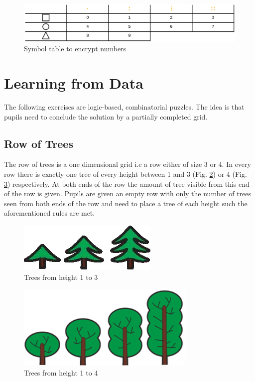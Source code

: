 \begin{figure} 
    \centering
    \includegraphics[width=1.0 \columnwidth]{figures/symbol_table.png}
    \caption{Symbol table to encrypt numbers} 
    \label{fig:symbol_table} 
\end{figure}

\section{Learning from Data}

The following exercises are logic-based, combinatorial puzzles. The idea is that pupils need to conclude the solution by a partially completed grid.

\subsection{Row of Trees}

The row of trees is a one dimensional grid i.e a row either of size 3 or 4. In every row there is exactly one tree of every height between 1 and 3 (Fig. \ref{fig:trees_3}) or 4 (Fig. \ref{fig:trees_4}) respectively. At both ends of the row the amount of tree visible from this end of the row is given.
Pupils are given an empty row with only the number of trees seen from both ends of the row and need to place a tree of each height such the aforementioned rules are met.

\begin{figure} 
    \centering
    \includegraphics[width=0.4 \columnwidth]{figures/trees_3.png}
    \caption{Trees from height 1 to 3} 
    \label{fig:trees_3} 
\end{figure}

\begin{figure} 
    \centering
    \includegraphics[width=0.4 \columnwidth]{figures/trees_4.png}
    \caption{Trees from height 1 to 4} 
    \label{fig:trees_4} 
\end{figure}

